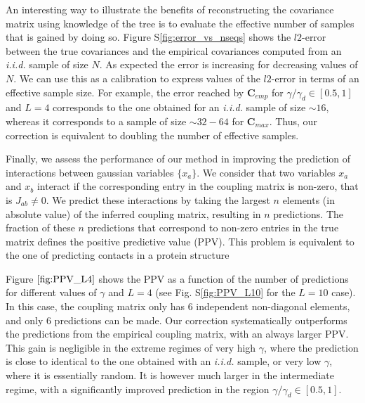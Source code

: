 \documentclass[preprint,amsmath,amssymb,superscriptaddress,showpacs,pre]{revtex4-1}
\newcommand{\sref}[1]{S\ref{#1}}
\begin{document}
An interesting way to illustrate the benefits of reconstructing the covariance matrix using knowledge of the tree is to evaluate the effective number of samples that is gained by doing so. 
Figure \sref{fig:error_vs_nseqs} shows the $l2$-error between the true covariances and the empirical covariances computed from an \emph{i.i.d.} sample of size $N$. 
As expected the error is increasing for decreasing values of $N$. 
We can use this as a calibration to express values of the $l2$-error in terms of an effective sample size.   
For example, the error reached by $\bm{C}_{emp}$ for $\gamma/\gamma_d\in[0.5, 1]$ and $L=4$ corresponds to the one obtained for an \emph{i.i.d.} sample of size $\sim 16$, whereas it corresponds to a sample of size $\sim 32-64$ for $\bm{C}_{max}$.
Thus, our correction is equivalent to doubling the number of effective samples.

Finally, we assess the performance of our method in improving the prediction of interactions between gaussian variables $\{x_a\}$. 
We consider that two variables $x_a$ and $x_b$ interact if the corresponding entry in the coupling matrix is non-zero, that is $J_{ab}\neq 0$. 
We predict these interactions by taking the largest $n$ elements (in absolute value) of the inferred coupling matrix, resulting in $n$ predictions. 
The fraction of these $n$ predictions that correspond to non-zero entries in the true matrix defines the positive predictive value (PPV). 
This problem is equivalent to the one of predicting contacts in a protein structure 

Figure $\ref{fig:PPV_L4}$ shows the PPV as a function of the number of predictions for different values of $\gamma$ and $L=4$ (see Fig. \sref{fig:PPV_L10} for the $L=10$ case). 
In this case, the coupling matrix only has $6$ independent non-diagonal elements, and only 6 predictions can be made. 
Our correction systematically outperforms the predictions from the empirical coupling matrix, with an always larger PPV. 
This gain is negligible in the extreme regimes of very high $\gamma$, where the prediction is close to identical to the one obtained with an \emph{i.i.d.} sample, or very low $\gamma$, where it is essentially random. 
It is however much larger in the intermediate regime, with a significantly improved prediction in the region $\gamma/\gamma_d\in[0.5,1]$.
\end{document}
